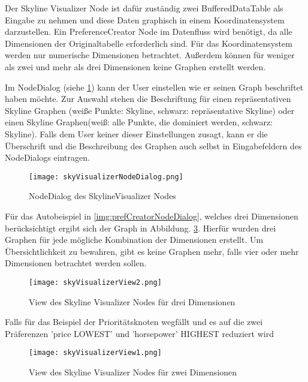 Der Skyline Visualizer Node ist dafür zuständig zwei BufferedDataTable als Eingabe zu nehmen und diese Daten graphisch in einem Koordinatensystem darzustellen. Ein PreferenceCreator Node im Datenfluss wird benötigt, da alle Dimensionen der Originaltabelle erforderlich sind. Für das Koordinatensystem werden nur numerische Dimensionen betrachtet. Außerdem können für weniger als zwei und mehr als drei Dimensionen keine Graphen erstellt werden.

Im NodeDialog (siehe \ref{img:skyVisualizerNodeDialog}) kann der User einstellen wie er seinen Graph beschriftet haben möchte. Zur Auswahl stehen die Beschriftung für einen repräsentativen Skyline Graphen (weiße Punkte: Skyline, schwarz: repräsentative Skyline) oder einen Skyline Graphen(weiß: alle Punkte, die dominiert werden, schwarz: Skyline). Falls dem User keiner dieser Einstellungen zusagt, kann er die Überschrift und die Beschreibung des Graphen auch selbst in Eingabefeldern des NodeDialogs eintragen.

\begin{figure}[H]
	\centering
	\texttt{[image: skyVisualizerNodeDialog.png]}
	\caption{NodeDialog des SkylineVisualizer Nodes}
	\label{img:skyVisualizerNodeDialog}
\end{figure}

Für das Autobeispiel in \ref{img:prefCreatorNodeDialog}, welches drei Dimensionen berücksichtigt ergibt sich der Graph in Abbildung. \ref{img:skyVisiualizerView1}. Hierfür wurden drei Graphen für jede mögliche Kombination der Dimensionen erstellt. Um Übersichtlichkeit zu bewahren, gibt es keine Graphen mehr, falls vier oder mehr Dimensionen betrachtet werden sollen.

\begin{figure}[ht]
	\centering
	\texttt{[image: skyVisualizerView2.png]}
	\caption{View des Skyline Visualizer Nodes für drei Dimensionen}
	\label{img:skyVisiualizerView2}
\end{figure}

Falls für das Beispiel der Prioritätsknoten wegfällt und es auf die zwei Präferenzen 'price LOWEST' und 'horsepower' HIGHEST reduziert wird

\begin{figure}[ht]
	\centering
	\texttt{[image: skyVisualizerView1.png]}
	\caption{View des Skyline Visualizer Nodes für zwei Dimensionen}
	\label{img:skyVisiualizerView1}
\end{figure}
